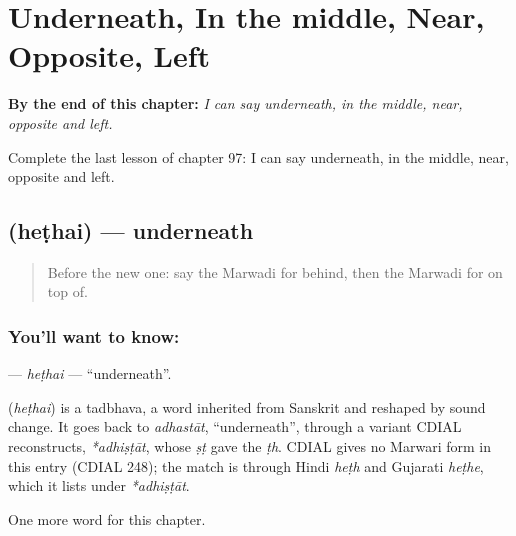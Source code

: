 
\chapter{Underneath, In the middle, Near, Opposite, Left}
\label{ch:mw-underneath-in-the-middle-near-opposite-left}

\begin{chapteropening}
\textbf{By the end of this chapter:} \emph{I can say underneath, in the middle, near, opposite and left.}

Complete the last lesson of chapter 97: I can say underneath, in the middle, near, opposite and left.
\end{chapteropening}

\section[\texorpdfstring{\mw{हेठै} (heṭhai)}{हेठै (heṭhai)}]{ (heṭhai) — underneath}

\label{lesson:MW-C97-hethai}



\begin{quote}
Before the new one: say the Marwadi for behind, then the Marwadi for on top of.
\end{quote}

\subsection*{You'll want to know: }
\textbf{} — \emph{heṭhai} — \textquotedblleft{}underneath\textquotedblright{}.

\begin{cousinweb}
\textbf{} (\emph{heṭhai}) is a tadbhava, a word inherited from Sanskrit and reshaped by sound change. It goes back to \emph{adhastāt}, \textquotedblleft{}underneath\textquotedblright{}, through a variant CDIAL reconstructs, \emph{*adhiṣṭāt}, whose \emph{ṣṭ} gave the \emph{ṭh}. CDIAL gives no Marwari form in this entry (CDIAL 248); the match is through Hindi \emph{heṭh} and Gujarati \emph{heṭhe}, which it lists under \emph{*adhiṣṭāt}.
\end{cousinweb}

\begin{grammarlens}[title={What you've built}]
One more word for this chapter.
\end{grammarlens}

